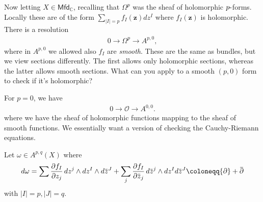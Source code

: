 \begin{remark}

Now letting \(X \in {\mathsf{Mfd}}_{\mathbb{C}}\), recalling that
\(\Omega^p\) was the sheaf of holomorphic \(p {\hbox{-}}\)forms. Locally
these are of the form
\(\sum_{{\left\lvert {I} \right\rvert} = p} f_I(\mathbf{z}) dz^I\) where
\(f_I(\mathbf{z})\) is holomorphic. There is a resolution
\begin{align*}
0 \xrightarrow{} \Omega^p \xrightarrow{} A^{p, 0}
,\end{align*}
where in \(A^{p, 0}\) we allowed also \(f_I\) are \emph{smooth}. These
are the same as bundles, but we view sections differently. The first
allows only holomorphic sections, whereas the latter allows smooth
sections. What can you apply to a smooth \((p, 0)\) form to check if
it's holomorphic?

\end{remark}

\begin{example}[?]

For \(p=0\), we have
\begin{align*}
0 \to {\mathcal{O}}\to A^{0, 0}
.\end{align*}
where we have the sheaf of holomorphic functions mapping to the sheaf of
smooth functions. We essentially want a version of checking the
Cauchy-Riemann equations.

\end{example}

\begin{definition}[?]

Let \(\omega\in A^{p, q}(X)\) where
\begin{align*}
d \omega = \sum {\frac{\partial f_I}{\partial z_j}\,} dz^j \wedge dz^I \wedge d\mkern 1.5mu\overline{\mkern-1.5muz\mkern-1.5mu}\mkern 1.5mu^J + \sum_j {\frac{\partial f_I}{\partial \mkern 1.5mu\overline{\mkern-1.5muz\mkern-1.5mu}\mkern 1.5mu_j}\,} d\mkern 1.5mu\overline{\mkern-1.5muz\mkern-1.5mu}\mkern 1.5mu^j \wedge dz^I d\mkern 1.5mu\overline{\mkern-1.5muz\mkern-1.5mu}\mkern 1.5mu^J\coloneqq{\partial}+ \mkern 1.5mu\overline{\mkern-1.5mu{\partial}\mkern-1.5mu}\mkern 1.5mu 
\end{align*}
with
\({\left\lvert {I} \right\rvert} = p, {\left\lvert {J} \right\rvert} = q\).

\end{definition}


